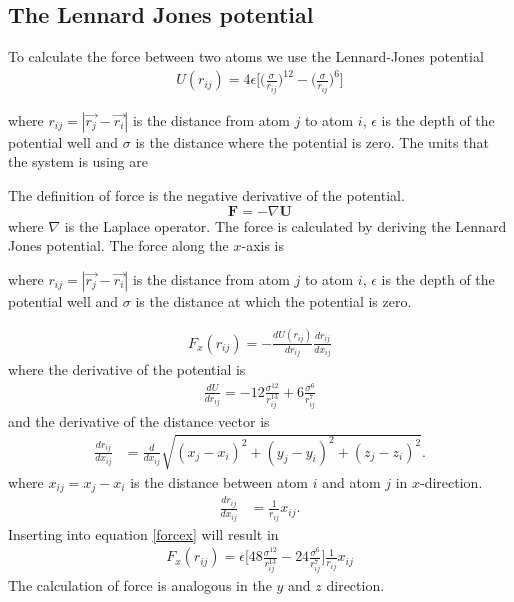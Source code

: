 \documentclass{article}
\begin{document}
\subsection{The Lennard Jones potential}

To calculate the force between two atoms we use the Lennard-Jones potential
\begin{align}
	U(r_{ij})=4\epsilon\Big[\Big(\frac{\sigma}{r_{ij}}\Big)^{12}-\Big(\frac{\sigma}{r_{ij}}\Big)^{6}\Big]
\end{align}

where $r_{ij}=|\vec{r_j}-\vec{r_i}|$ is the distance from atom $j$ to atom $i$, $\epsilon$ is the depth of the potential well and $\sigma$ is the distance where the potential is zero. The units that the system is using are

The definition of force is the negative derivative of the potential.
$$\mathbf{F}=-\nabla \mathbf{U}$$
where $\nabla$ is the Laplace operator.
The force is calculated by deriving the Lennard Jones potential. The force along the $x$-axis is

where $r_{ij}=|\vec{r_j}-\vec{r_i}|$ is the distance from atom $j$ to atom $i$, $\epsilon$ is the depth of the potential well and $\sigma$ is the distance at which the potential is zero.

\begin{align}
	F_x(r_{ij}) = - \frac{dU(r_{ij})}{dr_{ij}}\frac{dr_{ij}}{dx_{ij}}
	\label{forcex}
\end{align}
where the derivative of the potential is
\begin{align}
	\frac{dU}{dr_{ij}}=-12\frac{\sigma^{12}}{r_{ij}^{13}} + 6 \frac{\sigma^6}{r_{ij}^7}
\end{align}
and the derivative of the distance vector is
\begin{align}
	\frac{dr_{ij}}{dx_{ij}}&=\frac{d}{dx_{ij}}\sqrt{(x_j-x_i)^2+(y_j-y_i)^2+(z_j-z_i)^2}.
\end{align}
where $x_{ij}=x_j-x_i$ is the distance between atom $i$ and atom $j$ in $x$-direction.
\begin{align}
	\frac{dr_{ij}}{dx_{ij}}&=\frac{1}{r_{ij}}x_{ij}.
\end{align}
Inserting into equation \ref{forcex} will result in
\begin{align}
	F_x(r_{ij})= \epsilon \Big[48\frac{\sigma^{12}}{r_{ij}^{13}} - 24 \frac{\sigma^6}{r_{ij}^7}\Big]\frac{1}{r_{ij}}x_{ij}
\end{align}
The calculation of force is analogous in the $y$ and $z$ direction.
\end{document}

